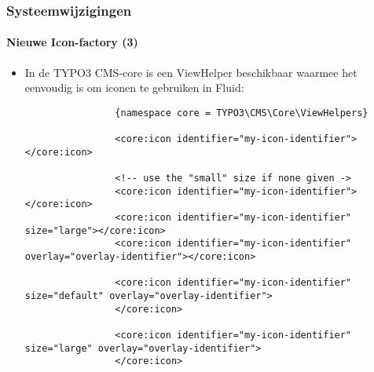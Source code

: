 \begin{frame}[fragile]
	\frametitle{Systeemwijzigingen}
	\framesubtitle{Nieuwe Icon-factory (3)}

	\lstset{basicstyle=\tiny\ttfamily}

	\begin{itemize}

		\item In de TYPO3 CMS-core is een ViewHelper beschikbaar waarmee het eenvoudig is om iconen te gebruiken in Fluid:

			\begin{lstlisting}
				{namespace core = TYPO3\CMS\Core\ViewHelpers}

				<core:icon identifier="my-icon-identifier"></core:icon>

				<!-- use the "small" size if none given ->
				<core:icon identifier="my-icon-identifier"></core:icon>
				<core:icon identifier="my-icon-identifier" size="large"></core:icon>
				<core:icon identifier="my-icon-identifier" overlay="overlay-identifier"></core:icon>

				<core:icon identifier="my-icon-identifier" size="default" overlay="overlay-identifier">
				</core:icon>

				<core:icon identifier="my-icon-identifier" size="large" overlay="overlay-identifier">
				</core:icon>
			\end{lstlisting}

	\end{itemize}

\end{frame}


